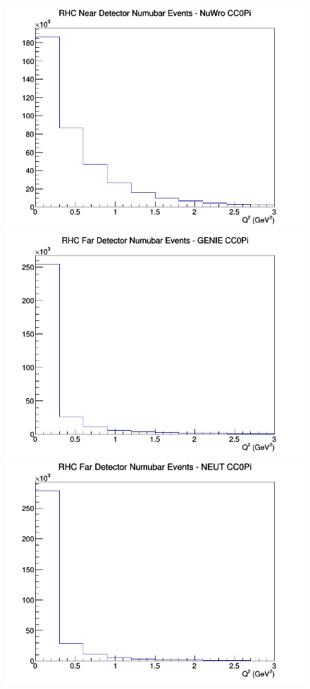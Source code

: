 \documentclass[12pt]{article}
\begin{document}
\begin{figure}[h]
\includegraphics[width=\linewidth]{eff_Q2/GAr/CC0Pi_RHC_ND_numubar_Q2_NuWro.png}
\endminipage
\newline
{}
\includegraphics[width=\linewidth]{eff_Q2/GAr/CC0Pi_RHC_FD_numubar_Q2_GENIE.png}
\endminipage
{}
\includegraphics[width=\linewidth]{eff_Q2/GAr/CC0Pi_RHC_FD_numubar_Q2_NEUT.png}

\end{figure}
\end{document}
